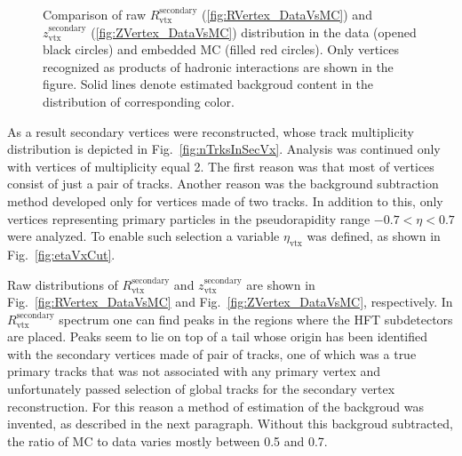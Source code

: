 \begin{figure}[b!]
{\begin{subfigure}[b]{\linewidth}
  \end{subfigure}
}\vspace{-5pt}%
\caption[Comparison of raw $R_{\text{vtx}}^{\text{secondary}}$ and $z_{\text{vtx}}^{\text{secondary}}$ distribution in the data and embedded MC.]%
{Comparison of raw $R_{\text{vtx}}^{\text{secondary}}$ (\ref{fig:RVertex_DataVsMC}) and $z_{\text{vtx}}^{\text{secondary}}$ (\ref{fig:ZVertex_DataVsMC}) distribution in the data (opened black circles) and embedded MC (filled red circles). Only vertices recognized as products of hadronic interactions are shown in the figure. Solid lines denote estimated backgroud content in the distribution of corresponding color.}\vspace{-10pt}\label{fig:RZVertexDataVsMC}%
\end{figure}

As a result secondary vertices were reconstructed, whose track multiplicity distribution is depicted in Fig.~\ref{fig:nTrksInSecVx}. Analysis was continued only with vertices of multiplicity equal 2. The first reason was that most of vertices consist of just a pair of tracks. Another reason was the background subtraction method developed only for vertices made of two tracks. In addition to this, only vertices representing primary particles in the pseudorapidity range $-0.7 < \eta < 0.7$ were analyzed. To enable such selection a variable $\eta_{\text{vtx}}$ was defined, as shown in Fig.~\ref{fig:etaVxCut}.

Raw distributions of $R_{\text{vtx}}^{\text{secondary}}$ and $z_{\text{vtx}}^{\text{secondary}}$ are shown in Fig.~\ref{fig:RVertex_DataVsMC} and Fig.~\ref{fig:ZVertex_DataVsMC}, respectively. In $R_{\text{vtx}}^{\text{secondary}}$ spectrum one can find peaks in the regions where the HFT subdetectors are placed. Peaks seem to lie on top of a tail whose origin has been identified with the secondary vertices made of pair of tracks, one of which was a true primary tracks that was not associated with any primary vertex and unfortunately passed selection of global tracks for the secondary vertex reconstruction. For this reason a method of estimation of the backgroud was invented, as described in the next paragraph. Without this backgroud subtracted, the ratio of MC to data varies mostly between 0.5 and 0.7.

